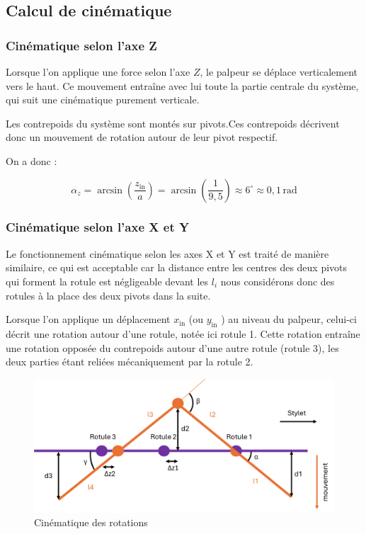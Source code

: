 \documentclass[a4paper, 11pt]{article} %
\begin{document}
\subsection{Calcul de cinématique}
\label{cinématique}

\subsubsection*{Cinématique selon l'axe Z}
Lorsque l’on applique une force selon l’axe \( Z \), le palpeur se déplace verticalement vers le haut. Ce mouvement entraîne avec lui toute la partie centrale du système, qui suit une cinématique purement verticale.

Les contrepoids du système sont montés sur pivots.Ces contrepoids décrivent donc un mouvement de rotation autour de leur pivot respectif.

On a donc :

$$
\alpha_z = \arcsin\left(\frac{z_{\text{in}}}{a}\right)  = \arcsin\left(\frac{1}{9,5}\right) \approx 6^\circ \approx 0{,}1 \, \text{rad}
$$

\subsubsection*{Cinématique selon l'axe X et Y}
Le fonctionnement cinématique selon les axes X et Y est traité de manière similaire, ce qui est acceptable car la distance entre les centres des deux pivots qui forment la rotule est négligeable devant les $l_i$ nous considérons donc des rotules à la place des deux pivots dans la suite.

Lorsque l’on applique un déplacement  $x_{\text{in}}$ (ou  $y_{\text{in}}$ ) au niveau du palpeur, celui-ci décrit une rotation autour d’une rotule, notée ici rotule 1. Cette rotation entraîne une rotation opposée du contrepoids autour d’une autre rotule (rotule 3), les deux parties étant reliées mécaniquement par la rotule 2.

\begin{figure}[H]
    \centering
    
    \includegraphics[width=1\linewidth]{images/trippitroppo.png}
    \caption{Cinématique des rotations}
    \label{fig:dessin cinematique}
\end{figure}
\end{document}
